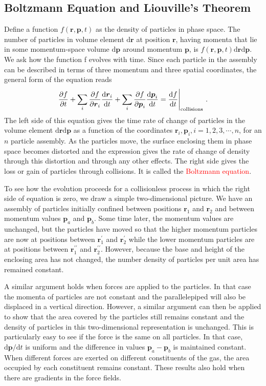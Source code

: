 \documentclass[12pt,a4paper]{article}
\renewcommand{\vec}[1]{\boldsymbol{#1}}
\newcommand{\dif}{\mathrm{d}}
\begin{document}
\subsection{Boltzmann Equation and Liouville's Theorem}
\cite{harwit2006astrophysical} Define a function $f(\vec{r}, \vec{p}, t)$ as the density of particles in phase space. The number of particles in volume element $\dif \vec{r}$ at position $\vec{r}$, having momenta that lie in some momentum-space volume $\dif \vec{p}$ around momentum $\vec{p}$, is $f(\vec{r}, \vec{p}, t) \dif \vec{r} \dif \vec{p}$. We ask how the function f evolves with time. Since each particle in the assembly can be described in terms of three momentum and three spatial coordinates, the general form of the equation reads
\begin{equation}
\dfrac{\partial f}{\partial t} + \sum_{i} \dfrac{\partial f}{\partial \vec{r}_i} \dfrac{\dif \vec{r}_i}{\dif t} + \sum_i  \dfrac{\partial f}{\partial \vec{p}_i} \dfrac{\dif \vec{p}_i}{\dif t}  = \dfrac{\dif f}{\dif t}\Bigg|_{\rm collisions} ~.
\end{equation}
The left side of this equation gives the time rate of change of particles in the volume element $\dif \vec{r} \dif \vec{p}$ as a function of the coordinates $\vec{r}_i, \vec{p}_i, i = 1, 2, 3, \cdots, n$, for an $n$ particle assembly. As the particles move, the surface enclosing them in phase space becomes distorted and the expression gives the rate of change of density through this distortion and through any other effects. The right side gives the loss or gain of particles through collisions. It is called the \textcolor{red}{Boltzmann equation}.

To see how the evolution proceeds for a collisionless process in which the right side of equation is zero, we draw a simple two-dimensional picture. We have an assembly of particles initially confined between positions $\vec{r}_1$ and $\vec{r}_2$ and between momentum values $\vec{p}_a$ and $\vec{p}_b$. Some time later, the momentum values are unchanged, but the particles have moved so that the higher momentum particles are now at positions between $\vec{r}^\prime_1$ and $\vec{r}^\prime_2$ while the lower momentum particles are at positions between $\vec{r}^{\prime \prime}_1$ and $\vec{r}^{\prime \prime}_2$. However, because the base and height of the enclosing area has not changed, the number density of particles per unit area has remained constant.

A similar argument holds when forces are applied to the particles. In that case the momenta of particles are not constant and the parallelepiped will also be displaced in a vertical direction. However, a similar argument can then be applied to show that the area covered by the particles still remains constant and the density of particles in this two-dimensional representation is unchanged. This is particularly easy to see if the force is the same on all particles. In that case, $\dif \vec{p}/\dif t$ is uniform and the difference in values $\vec{p}_a - \vec{p}_b$ is maintained constant. When different forces are exerted on different constituents of the gas, the area occupied by each constituent remains constant. These results also hold when there are gradients in the force fields.
\end{document}
